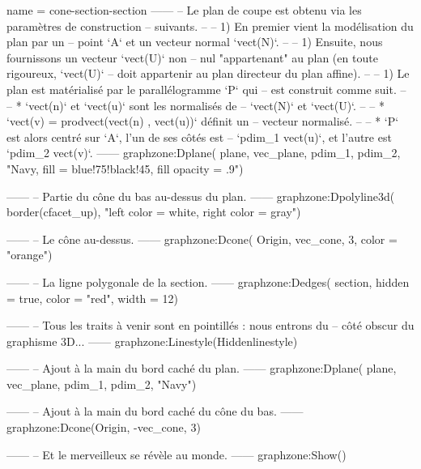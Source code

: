 \documentclass[varwidth, border = 3pt]{standalone}
\begin{document}
\begin{luadraw}{name = cone-section-section}
------
-- Le plan de coupe est obtenu via les paramètres de construction
-- suivants.
--
--     1) En premier vient la modélisation du plan par un
--     point `A` et un vecteur normal `vect(N)`.
--
--     1) Ensuite, nous fournissons un vecteur `vect(U)` non
--     nul "appartenant" au plan (en toute rigoureux, `vect(U)`
--     doit appartenir au plan directeur du plan affine).
--
--     1) Le plan est matérialisé par le parallélogramme `P` qui
--     est construit comme suit.
--
--         * `vect(n)` et `vect(u)` sont les normalisés de
--         `vect(N)` et `vect(U)`.
--
--         * `vect(v) = prodvect(vect(n) , vect(u))` définit un
--         vecteur normalisé.
--
--         * `P` est alors centré sur `A`, l'un de ses côtés est
--         `pdim_1 vect(u)`, et l'autre est `pdim_2 vect(v)`.
------
    graphzone:Dplane(
        plane,
        vec_plane, pdim_1, pdim_2,
        "Navy, fill = blue!75!black!45, fill opacity = .9")

------
-- Partie du cône du bas au-dessus du plan.
------
    graphzone:Dpolyline3d(
        border(cfacet_up),
        "left color = white, right color = gray")

------
-- Le cône au-dessus.
------
    graphzone:Dcone(
        Origin, vec_cone, 3,
        {color = "orange"})

------
-- La ligne polygonale de la section.
------
    graphzone:Dedges(
        section,
        {hidden = true, color = "red", width = 12})

------
-- Tous les traits à venir sont en pointillés : nous entrons du
-- côté obscur du graphisme 3D...
------
    graphzone:Linestyle(Hiddenlinestyle)

------
-- Ajout à la main du bord caché du plan.
------
    graphzone:Dplane(
        plane,
        vec_plane, pdim_1, pdim_2,
        "Navy")

------
-- Ajout à la main du bord caché du cône du bas.
------
    graphzone:Dcone(Origin, -vec_cone, 3)

------
-- Et le merveilleux se révèle au monde.
------
    graphzone:Show()
\end{luadraw}
\end{document}
